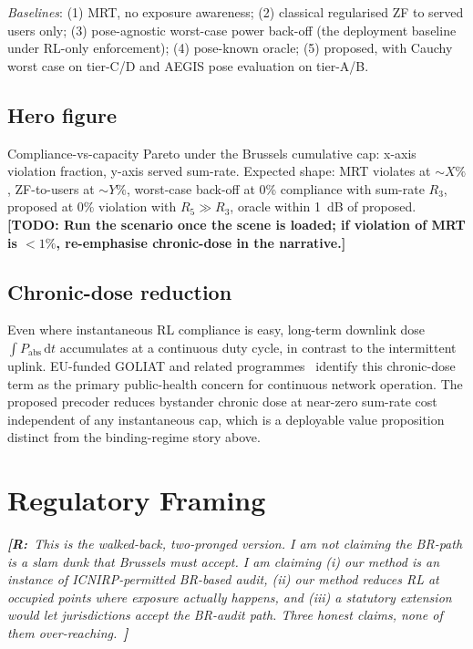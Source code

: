 \documentclass[journal,twocolumn,10pt]{IEEEtran}
\theoremstyle{definition}
\newcommand{\robinnote}[1]{%
  {\color{red!75!black}\textit{\textbf{[R:}~#1~\textbf{]}}}}
\newcommand{\TODO}[1]{\textcolor{red!80!black}{\textbf{[TODO: #1]}}}
\newcommand{\Pabs}{P_{\mathrm{abs}}}
\newcommand{\diff}{\mathrm{d}}
\begin{document}
\emph{Baselines}: (1) MRT, no exposure awareness; (2) classical
regularised ZF to served users only; (3) pose-agnostic
worst-case power back-off (the deployment baseline under
RL-only enforcement); (4) pose-known oracle; (5) proposed,
with Cauchy worst case on tier-C/D and AEGIS pose evaluation on
tier-A/B.

\subsection{Hero figure}\label{sec:hero}

Compliance-vs-capacity Pareto under the Brussels cumulative cap:
x-axis violation fraction, y-axis served sum-rate. Expected
shape: MRT violates at $\sim X\%$, ZF-to-users at $\sim Y\%$,
worst-case back-off at 0\% compliance with sum-rate $R_3$,
proposed at $0\%$ violation with $R_5\gg R_3$, oracle within
1~dB of proposed.
\TODO{Run the scenario once the scene is loaded; if violation of
MRT is $<1\%$, re-emphasise chronic-dose in the narrative.}

\subsection{Chronic-dose reduction}\label{sec:chronic}

Even where instantaneous RL compliance is easy, long-term
downlink dose $\int\Pabs\,\diff t$ accumulates at a continuous
duty cycle, in contrast to the intermittent uplink.
EU-funded GOLIAT and related programmes~\cite{GOLIAT} identify
this chronic-dose term as the primary
public-health concern for continuous network operation. The
proposed precoder reduces bystander chronic dose at near-zero
sum-rate cost independent of any instantaneous cap, which is a
deployable value proposition distinct from the binding-regime
story above.

\section{Regulatory Framing}\label{sec:regulatory}

\robinnote{This is the walked-back, two-pronged version. I am
\emph{not} claiming the BR-path is a slam dunk that Brussels
must accept. I am claiming (i) our method is an instance of
ICNIRP-permitted BR-based audit, (ii) our method reduces RL at
occupied points where exposure actually happens, and (iii) a
statutory extension would let jurisdictions accept the BR-audit
path. Three honest claims, none of them over-reaching.}
\end{document}
